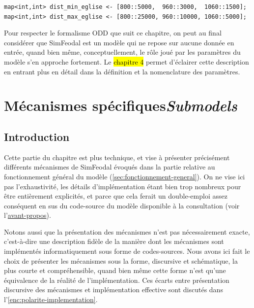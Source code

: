 {\footnotesize
\begin{lstlisting}[caption={
Deux exemples de \texttt{map} dans Gama.
\textit{À partir de 800, les églises doivent se situer entre 5 et 25~km, puis entre 3 et 10~km de 960 à 1060, et entre 1.5 et 5~km après cette date.}}, captionpos=b, label={lst:maps-gama}]
map<int,int> dist_min_eglise <- [800::5000,  960::3000,  1060::1500];
map<int,int> dist_max_eglise <- [800::25000, 960::10000, 1060::5000]; 
\end{lstlisting}
}

Pour respecter le formalisme ODD que suit ce chapitre, on peut au final considérer que SimFeodal est un modèle qui ne repose sur aucune donnée en entrée, quand bien même, conceptuellement, le rôle joué par les paramètres du modèle s'en approche fortement. Le \hl{chapitre 4} permet d'éclairer cette description en entrant plus en détail dans la définition et la nomenclature des paramètres.


\section[Mécanismes spécifiques -- \textit{Submodels}]{Mécanismes spécifiques\protect\newline \large{\textit{Submodels}}  \label{sec:meca-specifiques}}

\subsection{Introduction}

Cette partie du chapitre est plus technique, et vise à présenter précisément différents mécanismes de SimFeodal évoqués dans la partie relative au fonctionnement général du modèle (\cref{sec:fonctionnement-general}).
On ne vise ici pas l'exhaustivité, les détails d'implémentation étant bien trop nombreux pour être entièrement explicités, et parce que cela ferait un double-emploi assez conséquent en sus du code-source du modèle disponible à la consultation (voir l'\hyperlink{avant-propos}{avant-propos}).

Notons aussi que la présentation des mécanismes n'est pas nécessairement exacte, c'est-à-dire une description fidèle de la manière dont les mécanismes sont implémentés informatiquement sous forme de codes-sources.
Nous avons ici fait le choix de présenter les mécanismes sous la forme, discursive et schématique, la plus courte et compréhensible, quand bien même cette forme n'est qu'une \og équivalence\fg{} de la réalité de l'implémentation.
Ces écarts entre présentation discursive des mécanismes et implémentation effective sont discutés dans l'\cref{enc:polarite-implementation}.

